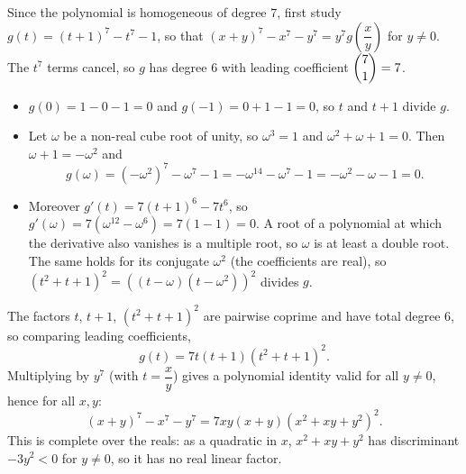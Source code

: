Since the polynomial is homogeneous of degree $7$, first study $g(t)=(t+1)^7-t^7-1$, so that $(x+y)^7-x^7-y^7=y^7g\!\left(\dfrac xy\right)$ for $y\ne0$. The $t^7$ terms cancel, so $g$ has degree $6$ with leading coefficient $\dbinom71=7$.

\begin{itemize}
\item $g(0)=1-0-1=0$ and $g(-1)=0+1-1=0$, so $t$ and $t+1$ divide $g$.
\item Let $\omega$ be a non-real cube root of unity, so $\omega^3=1$ and $\omega^2+\omega+1=0$. Then $\omega+1=-\omega^2$ and
\[g(\omega)=\left(-\omega^2\right)^7-\omega^7-1=-\omega^{14}-\omega^7-1=-\omega^2-\omega-1=0.\]
\item Moreover $g'(t)=7(t+1)^6-7t^6$, so $g'(\omega)=7\left(\omega^{12}-\omega^6\right)=7(1-1)=0$. A root of a polynomial at which the derivative also vanishes is a multiple root, so $\omega$ is at least a double root. The same holds for its conjugate $\omega^2$ (the coefficients are real), so $\left(t^2+t+1\right)^2=\left((t-\omega)\left(t-\omega^2\right)\right)^2$ divides $g$.
\end{itemize}
The factors $t$, $t+1$, $\left(t^2+t+1\right)^2$ are pairwise coprime and have total degree $6$, so comparing leading coefficients,
\[g(t)=7t(t+1)\left(t^2+t+1\right)^2.\]
Multiplying by $y^7$ (with $t=\dfrac xy$) gives a polynomial identity valid for all $y\ne0$, hence for all $x,y$:
\[\boxed{(x+y)^7-x^7-y^7=7xy(x+y)\left(x^2+xy+y^2\right)^2}.\]
This is complete over the reals: as a quadratic in $x$, $x^2+xy+y^2$ has discriminant $-3y^2<0$ for $y\ne0$, so it has no real linear factor.
